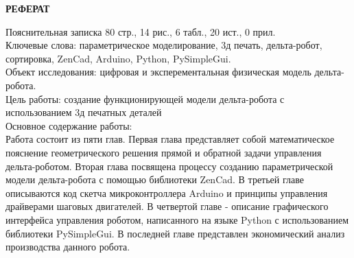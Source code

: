 \begin{center}
\large{\textbf{РЕФЕРАТ}}\\
\end{center}
Пояснительная записка 80 стр., 14 рис., 6 табл., 20 ист., 0 прил.\\
Ключевые слова: параметрическое моделирование, 3д печать, дельта-робот, сортировка, ZenCad, Arduino, Python, PySimpleGui.\\
Объект исследования:  цифровая и эксперементальная физическая модель дельта-робота.\\
Цель работы: создание функционирующей модели дельта-робота с использованием 3д печатных деталей\\
Основное содержание работы:\\
Работа состоит из пяти глав. Первая глава представляет собой математическое пояснение геометрического решения прямой и обратной задачи управления дельта-роботом. Вторая глава посвящена процессу созданию параметрической модели дельта-робота с помощью библиотеки ZenCad. В третьей главе описываются код скетча микроконтроллера Arduino и принципы управления драйверами шаговых двигателей. В четвертой главе - описание графического интерфейса управления роботом, написанного на языке Python с использованием библиотеки PySimpleGui. В последней главе представлен экономический анализ производства данного робота.    



